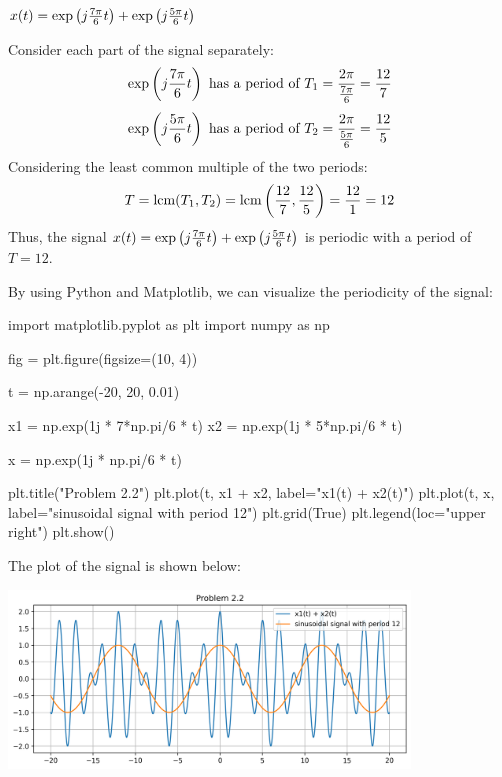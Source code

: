 \documentclass[a4paper, 10pt]{article}
\begin{document}
\newpage

\begin{subproblems}[start=2]
    \item \( x(t) = \exp \left( j\frac{7\pi}{6}t \right) +  \exp \left( j\frac{5\pi}{6}t \right) \)
\end{subproblems}

\begin{solution}
Consider each part of the signal separately:
\[
\exp \left( j\frac{7\pi}{6}t \right) \text{ has a period of } T_1 = \frac{2\pi}{\frac{7\pi}{6}} = \frac{12}{7}
\]
\[
\exp \left( j\frac{5\pi}{6}t \right) \text{ has a period of } T_2 = \frac{2\pi}{\frac{5\pi}{6}} = \frac{12}{5}
\]
Considering the least common multiple of the two periods:
\[
T = \text{lcm}(T_1, T_2) = \text{lcm}\left(\frac{12}{7}, \frac{12}{5}\right) = \frac{12}{1} = 12
\]
Thus, the signal \( x(t) = \exp \left( j\frac{7\pi}{6}t \right) +  \exp \left( j\frac{5\pi}{6}t \right) \) is periodic with a period of \( T = 12 \).

\vspace{5mm}

By using Python and Matplotlib, we can visualize the periodicity of the signal:
\begin{codingbox}
import matplotlib.pyplot as plt
import numpy as np

fig = plt.figure(figsize=(10, 4))

t = np.arange(-20, 20, 0.01)

x1 = np.exp(1j * 7*np.pi/6 * t)
x2 = np.exp(1j * 5*np.pi/6 * t)

x = np.exp(1j * np.pi/6 * t)

plt.title("Problem 2.2")
plt.plot(t, x1 + x2, label="x1(t) + x2(t)")
plt.plot(t, x, label="sinusoidal signal with period 12")
plt.grid(True)
plt.legend(loc="upper right")
plt.show()
\end{codingbox}
The plot of the signal is shown below:
\begin{center}
    \includegraphics[width=0.8\textwidth]{images/problem_2_2.png}
\end{center}
\end{solution}
\end{document}
